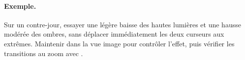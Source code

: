 \paragraph{Exemple.}
Sur un contre-jour, essayer une légère baisse des hautes lumières et une
hausse modérée des ombres, sans déplacer immédiatement les deux curseurs
aux extrêmes. Maintenir  dans la vue image pour contrôler
l’effet, puis vérifier les transitions au zoom avec .
\gestesreglages
